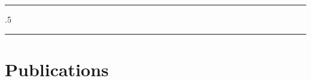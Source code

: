 \documentclass[
  12pt,
]
{article}
\begin{document}
\centerline{\huge \bf }

\vspace{2 mm}

\hrule

\vspace{2 mm}



\moveleft.5\hoffset\centerline{         }



\vspace{2 mm}

\hrule



\hypertarget{publications}{%
\section{Publications}\label{publications}}
\end{document}
